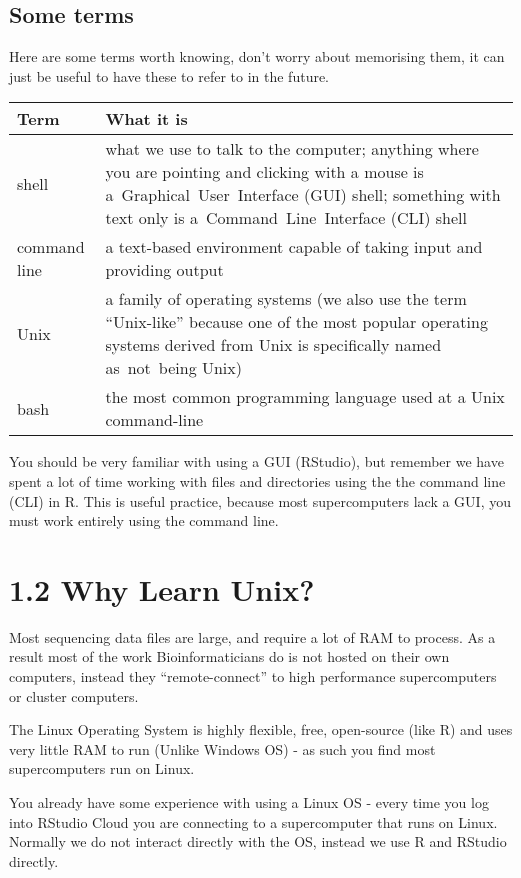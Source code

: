 \documentclass[
]{book}
\begin{document}
\hypertarget{some-terms}{%
\subsection{Some terms}\label{some-terms}}

Here are some terms worth knowing, don't worry about memorising them, it can just be useful to have these to refer to in the future.

\begin{longtable}{ll}
\toprule
\textbf{Term} & \textbf{What it is}\\
\midrule
shell & what we use to talk to the computer; anything where you are pointing and clicking with a mouse is a Graphical User Interface (GUI) shell; something with text only is a Command Line Interface (CLI) shell\\
command line & a text-based environment capable of taking input and providing output\\
Unix & a family of operating systems (we also use the term “Unix-like” because one of the most popular operating systems derived from Unix is specifically named as not being Unix)\\
bash & the most common programming language used at a Unix command-line\\
\bottomrule
\end{longtable}

You should be very familiar with using a GUI (RStudio), but remember we have spent a lot of time working with files and directories using the the command line (CLI) in R. This is useful practice, because most supercomputers lack a GUI, you must work entirely using the command line.

\hypertarget{why-learn-unix}{%
\section{1.2 Why Learn Unix?}\label{why-learn-unix}}

Most sequencing data files are large, and require a lot of RAM to process. As a result most of the work Bioinformaticians do is not hosted on their own computers, instead they ``remote-connect'' to high performance supercomputers or cluster computers.

The Linux Operating System is highly flexible, free, open-source (like R) and uses very little RAM to run (Unlike Windows OS) - as such you find most supercomputers run on Linux.

You already have some experience with using a Linux OS - every time you log into RStudio Cloud you are connecting to a supercomputer that runs on Linux. Normally we do not interact directly with the OS, instead we use R and RStudio directly.
\end{document}
